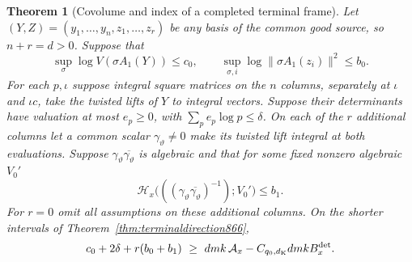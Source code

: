 \documentclass[a4paper,11pt]{article}
\newtheorem{theorem}[proposition]{Theorem}
\theoremstyle{definition}
\theoremstyle{remark}
\numberwithin{equation}{section}
\begin{document}
\begin{theorem}[Covolume and index of a completed terminal frame]
\leavevmode\label{thm:longframe867}
Let \((Y,Z)=(y_1,\ldots,y_n,z_1,\ldots,z_r)\) be any basis
of the common good source, so \(n+r=d>0\). Suppose that
\[
 \sup_\sigma\log V(\sigma A_1(Y))\le c_0,\qquad
 \sup_{\sigma,i}\log\|\sigma A_1(z_i)\|^2\le b_0 .
\]
For each \(p,\iota\) suppose integral square matrices on
the \(n\) columns, separately at \(\iota\) and \(\iota c\),
take the twisted lifts of \(Y\) to integral vectors. Suppose
their determinants have valuation at most \(e_p\ge0\), with
\(\sum_p e_p\log p\le\delta\). On each of the \(r\) additional
columns let a common scalar \(\gamma_\vartheta\ne0\) make
its twisted lift integral at both evaluations. Suppose
\(\gamma_\vartheta\overline{\gamma_\vartheta}\) is algebraic
and that for some fixed nonzero algebraic \(V_0'\)
\[
 \mathcal H_x\big(((\gamma_\vartheta
       \overline{\gamma_\vartheta})^{-1});V_0'\big)\le b_1.
\]
For \(r=0\) omit all assumptions on these additional columns.
On the shorter intervals of Theorem~\ref{thm:terminaldirection866},
\begin{equation}
 c_0+2\delta+r(b_0+b_1)
      \ \ge\ d m k\,\mathcal A_x-C_{q_0,d_{\rm K}}d m k B_x^{\rm det}.
 \label{eq:longframe867}
\end{equation}
\end{theorem}
\end{document}
